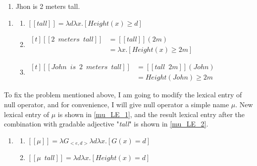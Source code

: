 \documentclass{ctexart}
\begin{document}
\begin{enumerate}[resume]
    \item \label{john_gao_2_mi} Jhon is 2 meters tall.
\end{enumerate}

\begin{enumerate}[resume]
    \item \label{john_gao_2_mi_LE}
    
    \begin{enumerate}[ref=(\arabic{enumi}\alph*)]
    \item \label{john_gao_2_mi_LE_a} 
    $[\![tall]\!] = \lambda d \lambda x.[Height(x) \geq d]$
    
    \item \label{john_gao_2_mi_LE_b} 
    $\begin{aligned}[t]
        [\![2 \enspace meters \enspace tall]\!] &= [\![tall]\!](2m) \\
        &= \lambda x.[Height(x) \geq 2m]
    \end{aligned}$
    
    \item \label{john_gao_2_mi_LE_c} 
    $\begin{aligned}[t]
        [\![John \enspace is \enspace 2 \enspace meters \enspace tall]\!] &= [\![tall \enspace 2m]\!](John) \\
        &= Height(John) \geq 2m
    \end{aligned}$
    
    \end{enumerate}
\end{enumerate}

To fix the problem mentioned above, I am going to modify the lexical entry of null operator, and for convenience, I will give null operator a simple name $\mu$. New lexical entry of $\mu$ is shown in \ref{mu_LE_1}, and the result lexical entry after the combination with gradable adjective "\textit{tall}" is shown in \ref{mu_LE_2}.

\begin{enumerate}[resume]
    \item \label{mu_LE}
    
    \begin{enumerate}[ref=(\arabic{enumi}\alph*)]
        \item \label{mu_LE_1}
        $[\![\mu]\!] =  \lambda G_{<e,d>}\lambda d \lambda x.[G(x) = d]$
        \item \label{mu_LE_2}
        $[\![\mu \enspace tall]\!] = \lambda d \lambda x.[Height(x) = d]$
    \end{enumerate}
\end{enumerate}
\end{document}
